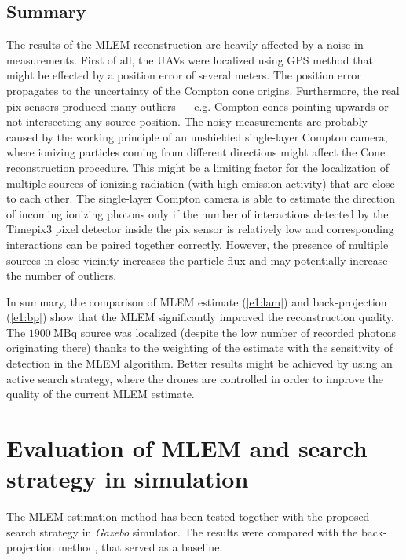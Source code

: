 \subsection{Summary}
The results of the \ac{MLEM} reconstruction are heavily affected by a noise in measurements.
First of all, the \ac{UAV}s were localized using \ac{GPS} method that might be effected by a position error of several meters.
The position error propagates to the uncertainty of the Compton cone origins.
Furthermore, the real \ac{pix} sensors produced many outliers --- e.g. Compton cones pointing upwards or not intersecting any source position. 
The noisy measurements are probably caused by the working principle of an unshielded single-layer Compton camera, where ionizing particles coming from different directions might affect the Cone reconstruction procedure.
This might be a limiting factor for the localization of multiple sources of ionizing radiation (with high emission activity) that are close to each other.
The single-layer Compton camera is able to estimate the direction of incoming ionizing photons only if the number of interactions detected by the Timepix3 pixel detector inside the \ac{pix} sensor is relatively low and corresponding interactions can be paired together correctly.
However, the presence of multiple sources in close vicinity increases the particle flux and may potentially increase the number of outliers.

In summary, the comparison of \ac{MLEM} estimate (\ref{e1:lam}) and back-projection (\ref{e1:bp}) show that the \ac{MLEM} significantly improved the reconstruction quality.
The $\SI{1900}{\mega\becquerel}$ source was localized (despite the low number of recorded photons originating there) 
thanks to the weighting of the estimate with the sensitivity of detection in the \ac{MLEM} algorithm.
Better results might be achieved by using an active search strategy, where the drones are controlled in order to improve the quality of the current \ac{MLEM} estimate.










\section{Evaluation of MLEM and search strategy in simulation\label{chap:exp2}}
The \ac{MLEM} estimation method has been tested together with the proposed search strategy in \textit{Gazebo} simulator. 
The results were compared with the back-projection method, that served as a baseline.

